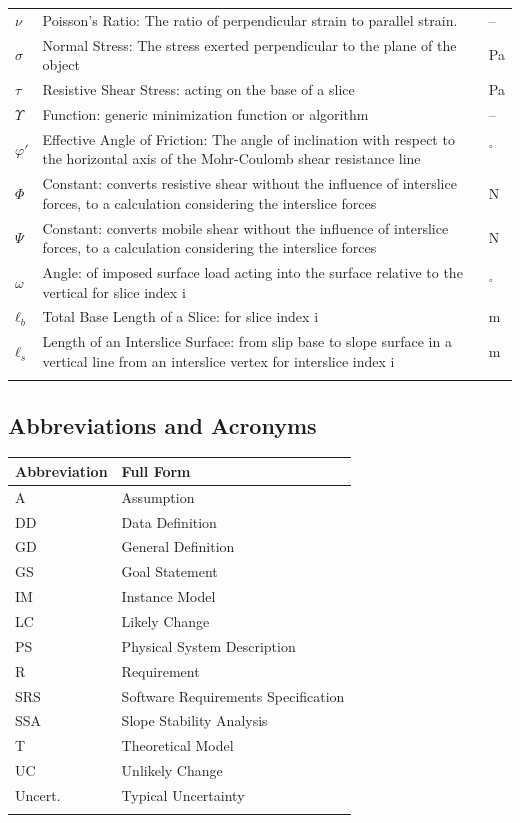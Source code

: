 \documentclass[12pt]{article}
\begin{document}
\begin{longtabu}{l X[l] l}
\\
$ν$ & Poisson's Ratio: The ratio of perpendicular strain to parallel strain. & --
\\
$σ$ & Normal Stress: The stress exerted perpendicular to the plane of the object & Pa
\\
$τ$ & Resistive Shear Stress: acting on the base of a slice & Pa
\\
$Υ$ & Function: generic minimization function or algorithm & --
\\
$φ'$ & Effective Angle of Friction: The angle of inclination with respect to the horizontal axis of the Mohr-Coulomb shear resistance line & ${}^{\circ}$
\\
$Φ$ & Constant: converts resistive shear without the influence of interslice forces, to a calculation considering the interslice forces & N
\\
$Ψ$ & Constant: converts mobile shear without the influence of interslice forces, to a calculation considering the interslice forces & N
\\
$ω$ & Angle: of imposed surface load acting into the surface relative to the vertical for slice index i & ${}^{\circ}$
\\
${ℓ_{b}}$ & Total Base Length of a Slice: for slice index i & m
\\
${ℓ_{s}}$ & Length of an Interslice Surface: from slip base to slope surface in a vertical line from an interslice vertex for interslice index i & m
\\
\bottomrule
\label{Table:ToS}
\end{longtabu}
\subsection{Abbreviations and Acronyms}
\label{Sec:TAbbAcc}
\begin{longtable*}{l l}
\toprule
Abbreviation & Full Form
\\
\midrule
A & Assumption
\\
DD & Data Definition
\\
GD & General Definition
\\
GS & Goal Statement
\\
IM & Instance Model
\\
LC & Likely Change
\\
PS & Physical System Description
\\
R & Requirement
\\
SRS & Software Requirements Specification
\\
SSA & Slope Stability Analysis
\\
T & Theoretical Model
\\
UC & Unlikely Change
\\
Uncert. & Typical Uncertainty
\\
\bottomrule
\label{Table:TAbbAcc}
\end{longtable*}
\end{document}
